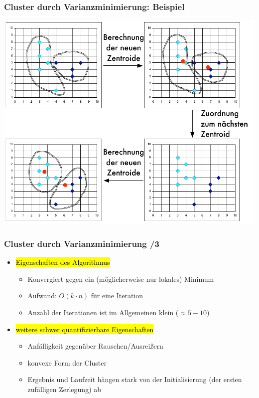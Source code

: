 \begin{frame}
\frametitle{Cluster durch  Varianzminimierung: Beispiel}

\begin{center}
\includegraphics[scale=.5]{fig7/zentroiden-varianz.pdf}
\end{center}


\end{frame}


\begin{frame}
\frametitle{Cluster durch  Varianzminimierung /3}

\begin{itemize}
\item \hl{Eigenschaften des Algorithmus}
\begin{itemize}
\item Konvergiert gegen ein (möglicherweise nur lokales) Minimum
\item Aufwand: $O(k \cdot n)$ für eine Iteration
\item Anzahl der Iterationen ist im Allgemeinen klein ($\approx 5 -
  10$)
\end{itemize}
\item \hl{weitere schwer quantifizierbare Eigenschaften}
\begin{itemize}
\item Anfälligkeit gegenüber Rauschen/Ausreißern
\item konvexe Form der Cluster
\item Ergebnis und Laufzeit hängen stark von der Initialisierung (der
  ersten zufälligen Zerlegung) ab
\end{itemize}
\end{itemize}

\end{frame}

